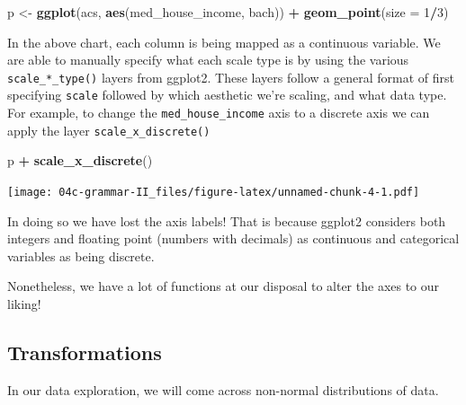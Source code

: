 \documentclass[
]{book}
\newenvironment{Shaded}{\begin{snugshade}}{\end{snugshade}}
\newcommand{\DataTypeTok}[1]{\textcolor[rgb]{0.13,0.29,0.53}{#1}}
\newcommand{\DecValTok}[1]{\textcolor[rgb]{0.00,0.00,0.81}{#1}}
\newcommand{\KeywordTok}[1]{\textcolor[rgb]{0.13,0.29,0.53}{\textbf{#1}}}
\newcommand{\NormalTok}[1]{#1}
\newcommand{\OperatorTok}[1]{\textcolor[rgb]{0.81,0.36,0.00}{\textbf{#1}}}
\newcommand{\StringTok}[1]{\textcolor[rgb]{0.31,0.60,0.02}{#1}}
\begin{document}
\begin{Shaded}
\begin{Highlighting}[]
\NormalTok{p \textless{}{-}}\StringTok{ }\KeywordTok{ggplot}\NormalTok{(acs, }\KeywordTok{aes}\NormalTok{(med\_house\_income, bach)) }\OperatorTok{+}
\StringTok{  }\KeywordTok{geom\_point}\NormalTok{(}\DataTypeTok{size =} \DecValTok{1}\OperatorTok{/}\DecValTok{3}\NormalTok{)}
\end{Highlighting}
\end{Shaded}

In the above chart, each column is being mapped as a continuous variable. We are able to manually specify what each scale type is by using the various \texttt{scale\_*\_type()} layers from ggplot2. These layers follow a general format of first specifying \texttt{scale} followed by which aesthetic we're scaling, and what data type. For example, to change the \texttt{med\_house\_income} axis to a discrete axis we can apply the layer \texttt{scale\_x\_discrete()}

\begin{Shaded}
\begin{Highlighting}[]
\NormalTok{p }\OperatorTok{+}
\StringTok{  }\KeywordTok{scale\_x\_discrete}\NormalTok{() }
\end{Highlighting}
\end{Shaded}

\texttt{[image: 04c-grammar-II\_files/figure-latex/unnamed-chunk-4-1.pdf]}

In doing so we have lost the axis labels! That is because ggplot2 considers both integers and floating point (numbers with decimals) as continuous and categorical variables as being discrete.

Nonetheless, we have a lot of functions at our disposal to alter the axes to our liking!

\hypertarget{transformations}{%
\subsection{Transformations}\label{transformations}}

In our data exploration, we will come across non-normal distributions of data.
\end{document}
